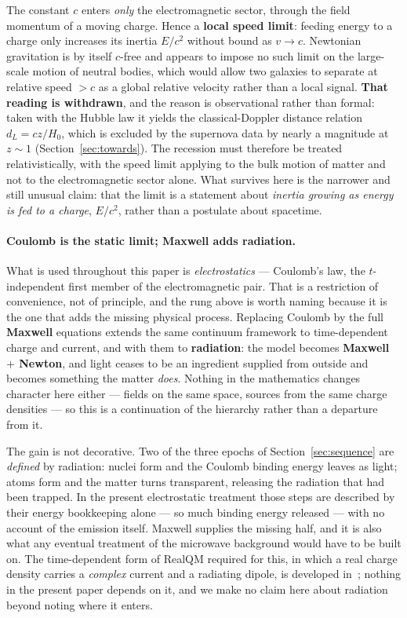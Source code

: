 \documentclass[11pt]{article}
\begin{document}
The constant $c$ enters \emph{only} the electromagnetic sector, through the field momentum of a moving charge.
Hence a \textbf{local speed limit}: feeding energy to a charge only increases its inertia $E/c^2$ without bound as
$v\to c$. Newtonian gravitation is by itself $c$-free and appears to impose no such limit on the
large-scale motion of neutral bodies, which would allow two galaxies to separate at relative speed $>c$ as a
global relative velocity rather than a local signal. \textbf{That reading is withdrawn}, and the reason is
observational rather than formal: taken with the Hubble law it yields the classical-Doppler distance relation
$d_L=cz/H_0$, which is excluded by the supernova data by nearly a magnitude at $z\sim1$
(Section~\ref{sec:towards}). The recession must therefore be treated relativistically, with the speed limit
applying to the bulk motion of matter and not to the electromagnetic sector alone. What survives here is the
narrower and still unusual claim: that the limit is a statement about \emph{inertia growing as energy is fed to a
charge}, $E/c^2$, rather than a postulate about spacetime.

\paragraph{Coulomb is the static limit; Maxwell adds radiation.} What is used throughout this paper is
\emph{electrostatics} --- Coulomb's law, the $t$-independent first member of the electromagnetic pair. That is a
restriction of convenience, not of principle, and the rung above is worth naming because it is the one that adds
the missing physical process. Replacing Coulomb by the full \textbf{Maxwell} equations extends the same continuum
framework to time-dependent charge and current, and with them to \textbf{radiation}: the model becomes
\textbf{Maxwell $+$ Newton}, and light ceases to be an ingredient supplied from outside and becomes something the
matter \emph{does}. Nothing in the mathematics changes character here either --- fields on the same space, sources
from the same charge densities --- so this is a continuation of the hierarchy rather than a departure from it.

The gain is not decorative. Two of the three epochs of Section~\ref{sec:sequence} are \emph{defined} by radiation:
nuclei form and the Coulomb binding energy leaves as light; atoms form and the matter turns transparent, releasing
the radiation that had been trapped. In the present electrostatic treatment those steps are described by their
energy bookkeeping alone --- so much binding energy released --- with no account of the emission itself. Maxwell
supplies the missing half, and it is also what any eventual treatment of the microwave background would have to be
built on. The time-dependent form of RealQM required for this, in which a real charge density carries a
\emph{complex} current and a radiating dipole, is developed in~\cite{complexrealqm}; nothing in the present paper
depends on it, and we make no claim here about radiation beyond noting where it enters.
\end{document}

